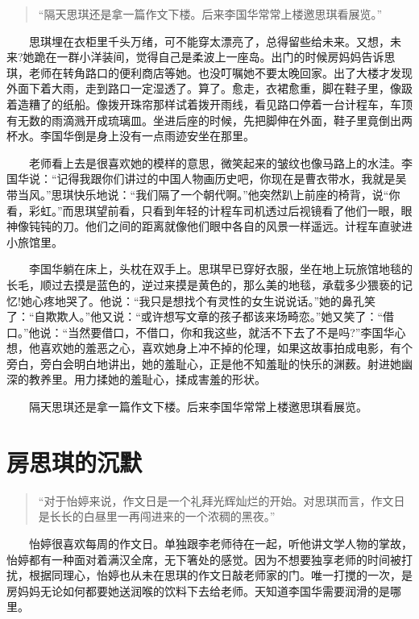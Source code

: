 \documentclass[12pt,UTF8]{ctexbook}
\begin{document}
\begin{quote}
\enquote{隔天思琪还是拿一篇作文下楼。后来李国华常常上楼邀思琪看展览。}
\end{quote}

　　思琪埋在衣柜里千头万绪，可不能穿太漂亮了，总得留些给未来。又想，未来?她跪在一群小洋装间，觉得自己是柔波上一座岛。出门的时候房妈妈告诉思琪，老师在转角路口的便利商店等她。也没叮嘱她不要太晚回家。出了大楼才发现外面下着大雨，走到路口一定湿透了。算了。愈走，衣裙愈重，脚在鞋子里，像趿着造糟了的纸船。像拨开珠帘那样试着拨开雨线，看见路口停着一台计程车，车顶有无数的雨滴溅开成琉璃皿。坐进后座的时候，先把脚伸在外面，鞋子里竟倒出两杯水。李国华倒是身上没有一点雨迹安坐在那里。

　　老师看上去是很喜欢她的模样的意思，微笑起来的皱纹也像马路上的水洼。李国华说：\enquote{记得我跟你们讲过的中国人物画历史吧，你现在是曹衣带水，我就是吴带当风。}思琪快乐地说：\enquote{我们隔了一个朝代啊。}他突然趴上前座的椅背，说\enquote{你看，彩虹。}而思琪望前看，只看到年轻的计程车司机透过后视镜看了他们一眼，眼神像钝钝的刀。他们之间的距离就像他们眼中各自的风景一样遥远。计程车直驶进小旅馆里。

　　李国华躺在床上，头枕在双手上。思琪早已穿好衣服，坐在地上玩旅馆地毯的长毛，顺过去摸是蓝色的，逆过来摸是黄色的，那么美的地毯，承载多少猥亵的记忆!她心疼地哭了。他说：\enquote{我只是想找个有灵性的女生说说话。}她的鼻孔笑了：\enquote{自欺欺人。}他又说：\enquote{或许想写文章的孩子都该来场畸恋。}她又笑了：\enquote{借口。}他说：\enquote{当然要借口，不借口，你和我这些，就活不下去了不是吗?}李国华心想，他喜欢她的羞恶之心，喜欢她身上冲不掉的伦理，如果这故事拍成电影，有个旁白，旁白会明白地讲出，她的羞耻心，正是他不知羞耻的快乐的渊薮。射进她幽深的教养里。用力揉她的羞耻心，揉成害羞的形状。

　　隔天思琪还是拿一篇作文下楼。后来李国华常常上楼邀思琪看展览。

\hypertarget{ux623fux601dux742aux7684ux6c89ux9ed8}{%
\section*{房思琪的沉默}\label{ux623fux601dux742aux7684ux6c89ux9ed8}}

\begin{quote}
\enquote{对于怡婷来说，作文日是一个礼拜光辉灿烂的开始。对思琪而言，作文日是长长的白昼里一再闯进来的一个浓稠的黑夜。}
\end{quote}

　　怡婷很喜欢每周的作文日。单独跟李老师待在一起，听他讲文学人物的掌故，怡婷都有一种面对着满汉全席，无下箸处的感觉。因为不想要独享老师的时间被打扰，根据同理心，怡婷也从未在思琪的作文日敲老师家的门。唯一打搅的一次，是房妈妈无论如何都要她送润喉的饮料下去给老师。天知道李国华需要润滑的是哪里。
\end{document}
